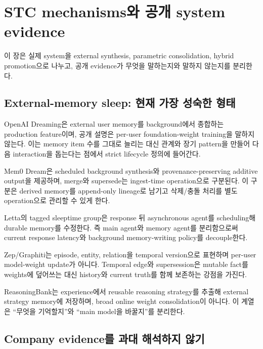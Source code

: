 \chapter{STC mechanisms와 공개 system evidence}
\label{STC-S07}

이 장은 실제 system을 external synthesis, parametric consolidation, hybrid promotion으로 나누고,
공개 evidence가 무엇을 말하는지와 말하지 않는지를 분리한다.

\section{External-memory sleep: 현재 가장 성숙한 형태}

OpenAI Dreaming은 external user memory를 background에서 종합하는 production feature이며, 공개 설명은
per-user foundation-weight training을 말하지 않는다. \parencite{srcstc0052}
이는 memory item 수를 그대로 늘리는 대신 관계와 장기 pattern을 만들어 다음 interaction을 돕는다는
점에서 strict lifecycle 정의에 들어간다.

Mem0 Dream은 scheduled background synthesis와 provenance-preserving additive output을 제공하며,
merge와 supersede는 ingest-time operation으로 구분된다.
\parencite{srcstc0063,srcstc0064} 이 구분은 derived memory를 append-only lineage로 남기고 삭제/충돌
처리를 별도 operation으로 관리할 수 있게 한다.

Letta의 tagged sleeptime group은 response 뒤 asynchronous agent를 scheduling해 durable memory를 수정한다.
 \parencite{srcstc0059} 즉 main agent와 memory agent를 분리함으로써 current response
latency와 background memory-writing policy를 decouple한다.

Zep/Graphiti는 episode, entity, relation을 temporal version으로 표현하며 per-user model-weight update가
아니다. \parencite{srcstc0016,srcstc0065,srcstc0066} Temporal edge와 supersession은 mutable
fact를 weights에 덮어쓰는 대신 history와 current truth를 함께 보존하는 강점을 가진다.

ReasoningBank는 experience에서 reusable reasoning strategy를 추출해 external strategy memory에 저장하며,
broad online weight consolidation이 아니다. \parencite{srcstc0043,srcstc0054} 이 계열은
``무엇을 기억할지''와 ``main model을 바꿀지''를 분리한다.

\section{Company evidence를 과대 해석하지 않기}

